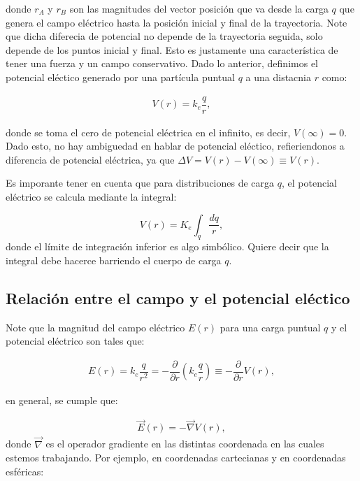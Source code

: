 donde $r_A$ y $r_B$ son las magnitudes del vector posición que va desde la carga $q$ que genera el campo eléctrico hasta la posición inicial y final de la trayectoria. Note que dicha diferecia de potencial no depende de la trayectoria seguida, solo depende de los puntos inicial y final. Esto es justamente una característica de tener una fuerza y un campo conservativo. Dado lo anterior, definimos el potencial eléctico generado por una partícula puntual $q$ a una distacnia $r$ como:

\begin{eqnarray}
V(r)= k_e \dfrac{q}{r} ,
\end{eqnarray}

donde se toma el cero de potencial eléctrica en el infinito, es decir, $V(\infty)=0$. Dado esto, no hay ambiguedad en hablar de potencial eléctico, refieriendonos a diferencia de potencial eléctrica, ya que $\Delta V = V(r) - V(\infty) \equiv V(r)$.

Es imporante tener en cuenta que para distribuciones de carga $q$, el potencial eléctrico se calcula mediante la integral:

\begin{equation}
\boxed{V(r)= K_e \int_q \dfrac{dq}{r} } , 
\end{equation}
donde el límite de integración inferior es algo simbólico. Quiere decir que la integral debe hacerce barriendo el cuerpo de carga $q$.

\subsection{Relación entre el campo y el potencial eléctico}

Note que la magnitud del campo eléctrico $E(r)$ para una carga puntual $q$ y el potencial eléctrico son tales que:

\begin{eqnarray}
E(r)= k_e \dfrac{q}{r^2}=- \dfrac{\partial }{\partial r }(k_e \dfrac{q}{r} ) \equiv - \dfrac{\partial }{\partial r } V(r), 
\end{eqnarray}

en general, se cumple que:

\begin{eqnarray}
\boxed{\vec{E}(r)= - \vec{\nabla}V(r) } ,
\end{eqnarray}
donde $\vec{\nabla}$ es el operador gradiente en las distintas coordenada en las cuales estemos trabajando. Por ejemplo, en coordenadas cartecianas y en coordenadas esféricas:

